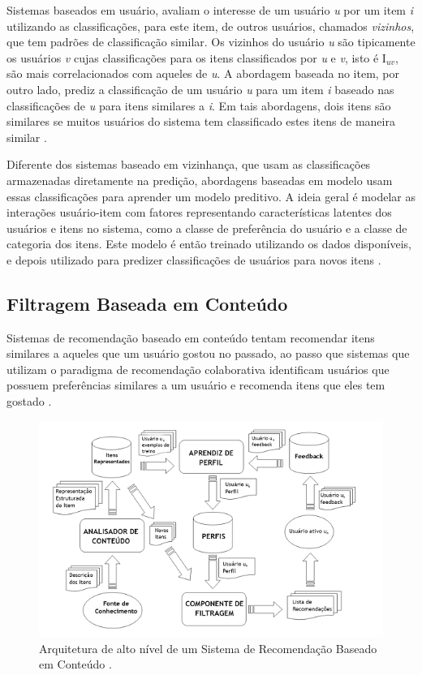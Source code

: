 Sistemas baseados em usuário, avaliam o interesse de um usuário \textit{u} por um item \textit{i} utilizando as classificações, para este item, de outros usuários, chamados \textit{vizinhos}, que tem padrões de classificação similar. Os vizinhos do usuário \textit{u} são tipicamente os usuários \textit{v} cujas classificações para os itens classificados por \textit{u} e \textit{v}, isto é I{$_{uv}$}, são mais correlacionados com aqueles de \textit{u}. A abordagem baseada no item, por outro lado, prediz a classificação de um usuário \textit{u} para um item \textit{i} baseado nas classificações de \textit{u} para itens similares a \textit{i}. Em tais abordagens, dois itens são similares se muitos usuários do sistema tem classificado estes itens de maneira similar \citep{ricci2011recommender}.

Diferente dos sistemas baseado em vizinhança, que usam as classificações armazenadas diretamente na predição, abordagens baseadas em modelo usam essas classificações para aprender um modelo preditivo. A ideia geral é modelar as interações usuário-item com fatores representando características latentes dos usuários e itens no sistema, como a classe de preferência do usuário e a classe de categoria dos itens. Este modelo é então treinado utilizando os dados disponíveis, e depois utilizado para predizer classificações de usuários para novos itens \citep{ricci2011recommender}.

\subsection{Filtragem Baseada em Conteúdo}

Sistemas de recomendação baseado em conteúdo tentam recomendar itens similares a aqueles que um usuário gostou no passado, ao passo que sistemas que utilizam o paradigma de recomendação colaborativa identificam usuários que possuem preferências similares a um usuário e recomenda itens que eles tem gostado \citep{lops2011ContentBased}.

\begin{figure}
	\centering
	\includegraphics{imagens/content_based_architecture.png}
	\caption{Arquitetura de alto nível de um Sistema de Recomendação Baseado em Conteúdo \citep{lops2011ContentBased}.}
	\label{fig:content_based_architecture}
\end{figure} 

